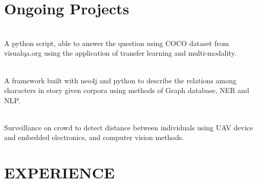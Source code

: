 \documentclass[]{deedy-resume-openfont}
\begin{document}
\begin{minipage}[t]{0.66\textwidth}

\section{Ongoing Projects}
\\
A python script, able to answer the question using COCO dataset from visualqa.org using the application of transfer learning and multi-modality.\\
\sectionsep

\\
A framework built with neo4j and python to describe the relations among characters in story given corpora using methods of Graph database, NER and NLP.\\
\sectionsep

\\
Surveillance on crowd to detect distance between individuals using UAV device and embedded electronics, and computer vision methods.
\sectionsep


\section{EXPERIENCE}
\sectionsep





\end{minipage}
\end{document}
